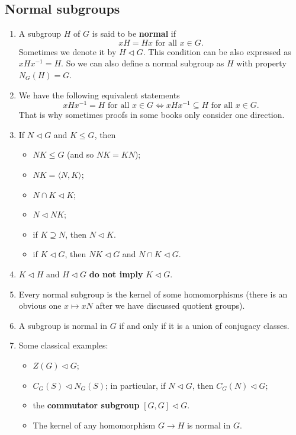 \subsection*{Normal subgroups}
\begin{enumerate}[(1)]
	\item A subgroup $H$ of $G$ is said to be \textbf{normal} if
	\begin{equation*}
		xH=Hx\text{ for all }x\in G.
	\end{equation*}
	Sometimes we denote it by $H\lhd G$. This condition can be also expressed as $xHx^{-1} = H$. So we can also define a normal subgroup as $H$ with property $N_G(H) = G$.
	\item We have the following equivalent statements
	\begin{equation*}
		xHx^{-1} = H\text{ for all }x\in G\Leftrightarrow xHx^{-1}\subseteq H\text{ for all }x\in G. 
	\end{equation*}
	That is why sometimes proofs in some books only consider one direction.
	\item If $N\lhd G$ and $K\leq G$, then
	\begin{itemize}
		\item $NK\leq G$ (and so $NK = KN$);
		\item $NK = \langle N,K\rangle$;
		\item $N\cap K\lhd K$;
		\item $N\lhd NK$;
		\item if $K\supseteq N$, then $N\lhd K$.
		\item if $K\lhd G$, then $NK\lhd G$ and $N\cap K\lhd G$.  
	\end{itemize}
	\item $K\lhd H$ and $H\lhd G$ \textbf{do not imply} $K\lhd G$.
	\item Every normal subgroup is the kernel of some homomorphisms (there is an obvious one $x\mapsto xN$ after we have discussed quotient groups).
	\item A subgroup is normal in $G$ if and only if it is a union of conjugacy classes.
	\item Some classical examples:
	\begin{itemize}
		\item $Z(G)\lhd G$;
		\item  $C_G(S)\lhd N_G(S)$; in particular, if $N\lhd G$, then $C_G(N)\lhd G$;
		\item the \textbf{commutator subgroup} $[G,G]\lhd G$.
		\item The kernel of any homomorphism $G\rightarrow H$ is normal in $G$.
	\end{itemize}  
\end{enumerate}